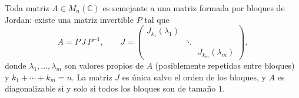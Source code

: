 \begin{theorem}\label{thm:cap08:jordan}
Toda matriz $A\in M_n(\mathbb{C})$ es semejante a una matriz formada por bloques de Jordan: existe una matriz invertible $P$ tal que
\[
A = P\, J\, P^{-1}, \qquad
J=\begin{pmatrix} J_{k_1}(\lambda_1) & & \\ & \ddots & \\ & & J_{k_m}(\lambda_m) \end{pmatrix},
\]
donde $\lambda_1,\dots,\lambda_m$ son valores propios de $A$ (posiblemente repetidos entre bloques) y $k_1+\cdots+k_m=n$. La matriz $J$ es única salvo el orden de los bloques, y $A$ es diagonalizable si y solo si todos los bloques son de tamaño $1$.
\end{theorem}

